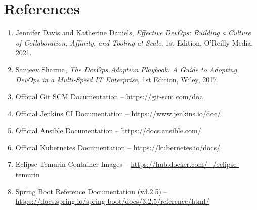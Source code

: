 \documentclass[12pt,a4paper]{article}
\begin{document}
\section*{References}
\begin{enumerate}[nosep]
    \item Jennifer Davis and Katherine Daniels, \textit{Effective DevOps: Building a Culture of Collaboration, Affinity, and Tooling at Scale}, 1st Edition, O'Reilly Media, 2021.
    \item Sanjeev Sharma, \textit{The DevOps Adoption Playbook: A Guide to Adopting DevOps in a Multi-Speed IT Enterprise}, 1st Edition, Wiley, 2017.
    \item Official Git SCM Documentation -- \url{https://git-scm.com/doc}
    \item Official Jenkins CI Documentation -- \url{https://www.jenkins.io/doc/}
    \item Official Ansible Documentation -- \url{https://docs.ansible.com/}
    \item Official Kubernetes Documentation -- \url{https://kubernetes.io/docs/}
    \item Eclipse Temurin Container Images -- \url{https://hub.docker.com/_/eclipse-temurin}
    \item Spring Boot Reference Documentation (v3.2.5) -- \url{https://docs.spring.io/spring-boot/docs/3.2.5/reference/html/}
\end{enumerate}
\end{document}
